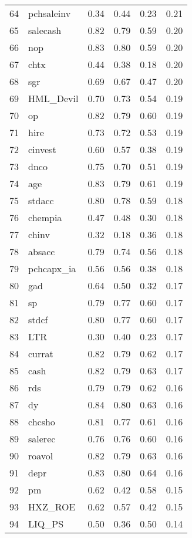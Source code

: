\documentclass[12pt]{article}
\begin{document}
\begin{footnotesize}
\begin{longtable}{rl|c|c|c|c}
  64 & pchsaleinv & 0.34 & 0.44 & 0.23 & 0.21 \\ 
  65 & salecash & 0.82 & 0.79 & 0.59 & 0.20 \\ 
  66 & nop & 0.83 & 0.80 & 0.59 & 0.20 \\ 
  67 & chtx & 0.44 & 0.38 & 0.18 & 0.20 \\ 
  68 & sgr & 0.69 & 0.67 & 0.47 & 0.20 \\ 
  69 & HML\_Devil & 0.70 & 0.73 & 0.54 & 0.19 \\ 
  70 & op & 0.82 & 0.79 & 0.60 & 0.19 \\ 
  71 & hire & 0.73 & 0.72 & 0.53 & 0.19 \\ 
  72 & cinvest & 0.60 & 0.57 & 0.38 & 0.19 \\ 
  73 & dnco & 0.75 & 0.70 & 0.51 & 0.19 \\ 
  74 & age & 0.83 & 0.79 & 0.61 & 0.19 \\ 
  75 & stdacc & 0.80 & 0.78 & 0.59 & 0.18 \\ 
  76 & chempia & 0.47 & 0.48 & 0.30 & 0.18 \\ 
  77 & chinv & 0.32 & 0.18 & 0.36 & 0.18 \\ 
  78 & absacc & 0.79 & 0.74 & 0.56 & 0.18 \\ 
  79 & pchcapx\_ia & 0.56 & 0.56 & 0.38 & 0.18 \\ 
  80 & gad & 0.64 & 0.50 & 0.32 & 0.17 \\ 
  81 & sp & 0.79 & 0.77 & 0.60 & 0.17 \\ 
  82 & stdcf & 0.80 & 0.77 & 0.60 & 0.17 \\ 
  83 & LTR & 0.30 & 0.40 & 0.23 & 0.17 \\ 
  84 & currat & 0.82 & 0.79 & 0.62 & 0.17 \\ 
  85 & cash & 0.82 & 0.79 & 0.63 & 0.17 \\ 
  86 & rds & 0.79 & 0.79 & 0.62 & 0.16 \\ 
  87 & dy & 0.84 & 0.80 & 0.63 & 0.16 \\ 
  88 & chcsho & 0.81 & 0.77 & 0.61 & 0.16 \\ 
  89 & salerec & 0.76 & 0.76 & 0.60 & 0.16 \\ 
  90 & roavol & 0.82 & 0.79 & 0.63 & 0.16 \\ 
  91 & depr & 0.83 & 0.80 & 0.64 & 0.16 \\ 
  92 & pm & 0.62 & 0.42 & 0.58 & 0.15 \\ 
  93 & HXZ\_ROE & 0.62 & 0.57 & 0.42 & 0.15 \\ 
  94 & LIQ\_PS & 0.50 & 0.36 & 0.50 & 0.14 \\ 

\end{longtable}
\end{footnotesize}
\end{document}
